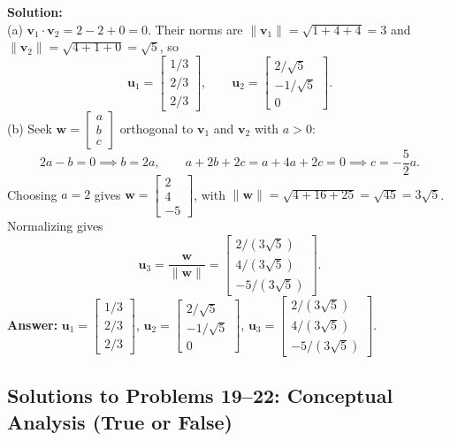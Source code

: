 \documentclass[11pt, letterpaper]{article}
\theoremstyle{definition}
\theoremstyle{remark}
\begin{document}
\textbf{Solution:} \\
(a) $\mathbf{v}_1 \cdot \mathbf{v}_2 = 2 - 2 + 0 = 0$. Their norms are $\|\mathbf{v}_1\| = \sqrt{1 + 4 + 4} = 3$ and $\|\mathbf{v}_2\| = \sqrt{4 + 1 + 0} = \sqrt{5}$, so
\[
\mathbf{u}_1 = \begin{bmatrix} 1/3 \\ 2/3 \\ 2/3 \end{bmatrix}, \qquad
\mathbf{u}_2 = \begin{bmatrix} 2/\sqrt{5} \\ -1/\sqrt{5} \\ 0 \end{bmatrix}.
\]
(b) Seek $\mathbf{w} = \begin{bmatrix} a \\ b \\ c \end{bmatrix}$ orthogonal to $\mathbf{v}_1$ and $\mathbf{v}_2$ with $a > 0$:
\[
2a - b = 0 \implies b = 2a, \qquad
a + 2b + 2c = a + 4a + 2c = 0 \implies c = -\frac{5}{2}a.
\]
Choosing $a = 2$ gives $\mathbf{w} = \begin{bmatrix} 2 \\ 4 \\ -5 \end{bmatrix}$, with $\|\mathbf{w}\| = \sqrt{4 + 16 + 25} = \sqrt{45} = 3\sqrt{5}$. Normalizing gives
\[
\mathbf{u}_3 = \frac{\mathbf{w}}{\|\mathbf{w}\|} = \begin{bmatrix} 2/(3\sqrt{5}) \\ 4/(3\sqrt{5}) \\ -5/(3\sqrt{5}) \end{bmatrix}.
\]
\textbf{Answer:} $\mathbf{u}_1 = \begin{bmatrix} 1/3 \\ 2/3 \\ 2/3 \end{bmatrix}$, $\mathbf{u}_2 = \begin{bmatrix} 2/\sqrt{5} \\ -1/\sqrt{5} \\ 0 \end{bmatrix}$, $\mathbf{u}_3 = \begin{bmatrix} 2/(3\sqrt{5}) \\ 4/(3\sqrt{5}) \\ -5/(3\sqrt{5}) \end{bmatrix}$.

\subsection{Solutions to Problems 19--22: Conceptual Analysis (True or False)}
\end{document}
